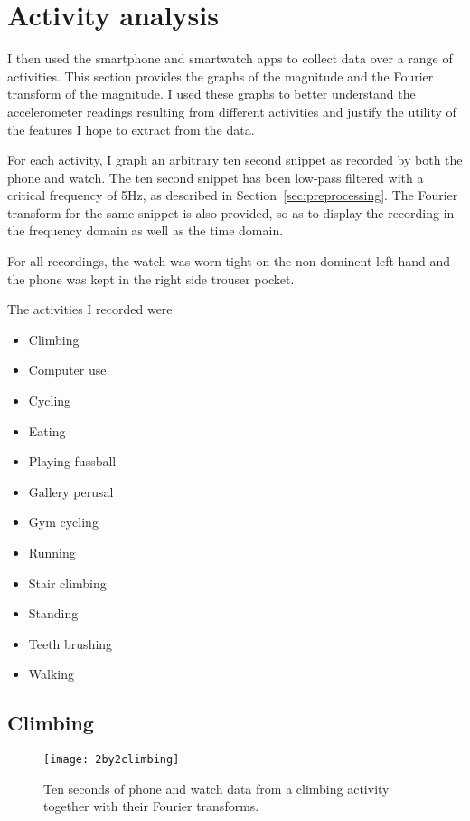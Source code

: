   \section{Activity analysis}
    \label{sec:activity-details}
    I then used the smartphone and smartwatch apps to collect data over a range of activities. This section provides the graphs of the magnitude and the Fourier transform of the magnitude. I used these graphs to better understand the accelerometer readings resulting from different activities and justify the utility of the features I hope to extract from the data.
    
    For each activity, I graph an arbitrary ten second snippet as recorded by both the phone and watch. The ten second snippet has been low-pass filtered with a critical frequency of 5Hz, as described in Section~\ref{sec:preprocessing}. The Fourier transform for the same snippet is also provided, so as to display the recording in the frequency domain as well as the time domain.
    
    For all recordings, the watch was worn tight on the non-dominent left hand and the phone was kept in the right side trouser pocket.
    
    The activities I recorded were
    \begin{itemize}
      \item Climbing
      \item Computer use
      \item Cycling
      \item Eating
      \item Playing fussball
      \item Gallery perusal
      \item Gym cycling
      \item Running
      \item Stair climbing
      \item Standing
      \item Teeth brushing
      \item Walking
    \end{itemize}
    \subsection{Climbing}
      \begin{figure}[!th]
        \centering
        \texttt{[image: 2by2climbing]}
        \caption{Ten seconds of phone and watch data from a climbing activity together with their Fourier transforms.}
        \label{fig:2by2climbing }
      \end{figure}
      
